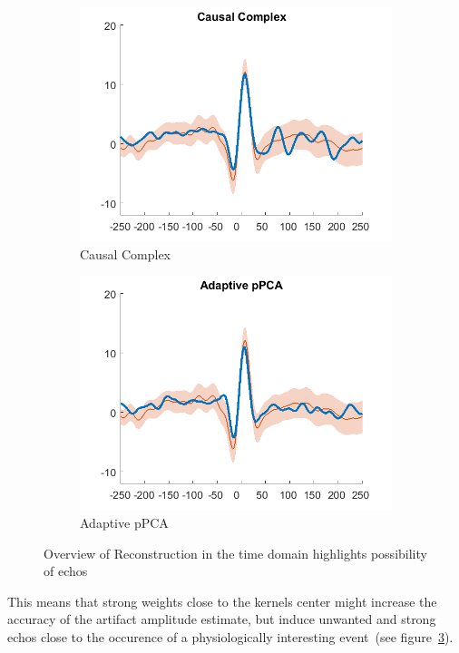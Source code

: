 \documentclass[a4paper]{article}
\newcommand{\figref}[1]{(see figure~\ref{#1})}
\begin{document}
\begin{figure}[hbtp]
\begin{subfigure}{0.245\textwidth}
        \includegraphics[width=\textwidth]{./img/eva/ecg_td_Causal_Complex.png}
        \caption{Causal Complex}\label{fig:td_causaldft}
    \end{subfigure}
    \begin{subfigure}{0.245\textwidth}
        \includegraphics[width=\textwidth]{./img/eva/ecg_td_Adaptive_pPCA.png}
        \caption{Adaptive pPCA}\label{fig:td_pPCA}
    \end{subfigure}
    \caption{Overview of Reconstruction in the time domain highlights possibility of echos}\label{fig:td_echo}
\end{figure}

This means that strong weights close to the kernels center might increase the accuracy of the artifact amplitude estimate, but induce unwanted and strong echos close to the occurence of a physiologically interesting event~\figref{fig:td_echo}.
\end{document}
